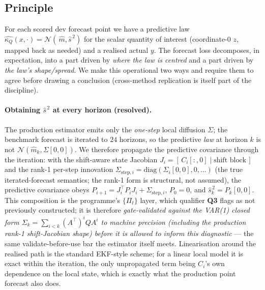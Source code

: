 \documentclass[11pt]{article}
\newcommand{\kQ}{\kappa_{Q}}
\newcommand{\Nrm}{\mathcal{N}}
\begin{document}
\subsection{Principle}

For each scored dev forecast point we have a predictive law
$\widehat{\kQ}(x,\cdot)=\Nrm(\,\widehat{m},\widehat{s}^{\,2})$ for the
scalar quantity of interest (coordinate-0 $z$, mapped back as needed) and
a realised actual $y$. The forecast loss decomposes, in expectation, into
a part driven by \emph{where the law is centred} and a part driven by
\emph{the law's shape/spread}. We make this operational two ways and
require them to agree before drawing a conclusion (cross-method
replication is itself part of the discipline).

\paragraph{Obtaining $\widehat{s}^{\,2}$ at every horizon (resolved).}
The production estimator emits only the \emph{one-step} local diffusion
$\Sigma$; the benchmark forecast is iterated to $24$ horizons, so the
predictive \emph{law} at horizon $k$ is not $\Nrm(\widehat{m}_k,
\Sigma[0,0])$. We therefore propagate the predictive covariance through
the iteration: with the shift-aware state Jacobian
$J_i = [\,C_i[:,0]\mid\text{shift block}\,]$ and the rank-1 per-step
innovation $\Sigma_{\text{step},i}=\mathrm{diag}(\Sigma_i[0,0],0,\dots)$
(the true iterated-forecast semantics; the rank-1 form is structural,
not assumed), the predictive covariance obeys
$P_{i+1}=J_i^{\!\top}P_iJ_i+\Sigma_{\text{step},i}$, $P_0=0$, and
$\widehat{s}^{\,2}_k=P_k[0,0]$. This composition is the programme's
$\{\Pi_t\}$ layer, which qualifier \textbf{Q3} flags as not previously
constructed; it is therefore \emph{gate-validated against the VAR(1)
closed form $\Sigma_k=\sum_{i<k}(A^{\!\top})^iQA^i$ to machine precision
(including the production rank-1 shift-Jacobian shape) before it is
allowed to inform this diagnostic} --- the same validate-before-use bar
the estimator itself meets. Linearisation around the realised path is
the standard EKF-style scheme; for a linear local model it is exact
within the iteration, the only unpropagated term being $C_i$'s own
dependence on the local state, which is exactly what the production
point forecast also does.
\end{document}
